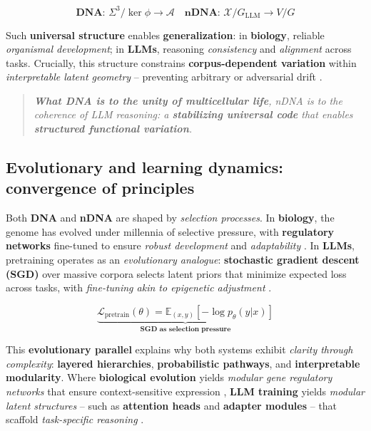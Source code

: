 \[
\boxed{
\textbf{DNA: } \Sigma^3 / \ker \phi \to \mathcal{A} \quad 
\textbf{nDNA: } \mathcal{X} / G_{\mathrm{LLM}} \to V/G
}
\]

Such \textbf{universal structure} enables \textbf{generalization}: 
in \textbf{biology}, reliable \emph{organismal development}; 
in \textbf{LLMs}, reasoning \emph{consistency} and \emph{alignment} across tasks. 
Crucially, this structure constrains \textbf{corpus-dependent variation} within \emph{interpretable latent geometry} -- preventing arbitrary or adversarial drift \citep{geva2021transformer, cobbe2021training}. 

\vspace{-2mm}
\begin{quote}
\emph{\textbf{What DNA is to the unity of multicellular life}, nDNA is to the coherence of LLM reasoning: a \textbf{stabilizing universal code} that enables \textbf{structured functional variation}.}
\end{quote}


\subsection*{Evolutionary and learning dynamics: convergence of principles}
Both \textbf{DNA} and \textbf{nDNA} are shaped by \emph{selection processes}. 
In \textbf{biology}, the genome has evolved under millennia of selective pressure, with \textbf{regulatory networks} fine-tuned to ensure \emph{robust development} and \emph{adaptability} \citep{alon2006introduction, davidson2006gene}. 
In \textbf{LLMs}, pretraining operates as an \emph{evolutionary analogue}: \textbf{stochastic gradient descent (SGD)} over massive corpora selects latent priors that minimize expected loss across tasks, with \emph{fine-tuning akin to epigenetic adjustment} \citep{bommasani2021opportunities, pfeiffer2021adapterfusion}. 

\[
\underbrace{
\mathcal{L}_{\mathrm{pretrain}}(\theta) = \mathbb{E}_{(x,y)} \left[ -\log p_\theta(y|x) \right]
}_{\textbf{SGD as selection pressure}}
\]

This \textbf{evolutionary parallel} explains why both systems exhibit \emph{clarity through complexity}: \textbf{layered hierarchies}, \textbf{probabilistic pathways}, and \textbf{interpretable modularity}. 
Where \textbf{biological evolution} yields \emph{modular gene regulatory networks} that ensure context-sensitive expression \citep{alon2006introduction}, \textbf{LLM training} yields \emph{modular latent structures} -- such as \textbf{attention heads} and \textbf{adapter modules} -- that scaffold \emph{task-specific reasoning} \citep{geva2021transformer, pfeiffer2021adapterfusion}.


